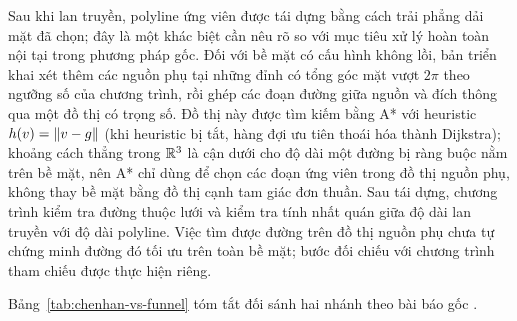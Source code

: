 \begin{code}[!t]
  
  \caption{Thuật toán 1 (\texttt{funnel\_tree.py}): dựng funnel tree gốc $s$.}
  \label{code:alg1}
\end{code}

\begin{code}[!t]
  
  \caption{Thuật toán 1 (\texttt{funnel\_expand.py}): mở rộng một phễu.}
  \label{code:alg1-expand}
\end{code}

\begin{code}[!t]
  
  \caption{Thủ tục 2 (\texttt{funnel\_clip.py}): clip off funnels.}
  \label{code:clip2}
\end{code}

Sau khi lan truyền, polyline ứng viên được tái dựng bằng cách trải phẳng dải mặt
đã chọn; đây là một khác biệt cần nêu rõ so với mục tiêu xử lý hoàn toàn nội tại
trong phương pháp gốc. Đối với bề mặt có cấu hình không lồi, bản triển khai xét
thêm các nguồn phụ tại những đỉnh có tổng góc mặt vượt $2\pi$ theo ngưỡng số của
chương trình, rồi ghép các đoạn đường giữa nguồn và đích thông qua một đồ thị có
trọng số. Đồ thị này được tìm kiếm bằng A* với heuristic $h(v)=\left\lVert v-g \right\rVert$
(khi heuristic bị tắt, hàng đợi ưu tiên thoái hóa thành Dijkstra); khoảng cách
thẳng trong $\mathbb{R}^3$ là cận dưới cho độ dài một đường
bị ràng buộc nằm trên bề mặt, nên A* chỉ dùng để chọn các đoạn ứng viên trong đồ
thị nguồn phụ, không thay bề mặt bằng đồ thị cạnh tam giác đơn thuần. Sau tái dựng,
chương trình kiểm tra đường thuộc lưới và kiểm tra tính nhất quán giữa độ dài lan
truyền với độ dài polyline. Việc tìm được đường trên đồ thị nguồn phụ chưa tự
chứng minh đường đó tối ưu trên toàn bề mặt; bước đối chiếu với chương trình tham
chiếu được thực hiện riêng.

Bảng~\ref{tab:chenhan-vs-funnel} tóm tắt đối sánh hai nhánh theo bài báo gốc
\cite{an2024funnel}.

